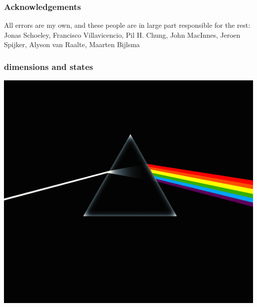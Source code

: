 \documentclass[20pt]{beamer}
\begin{document}
\begin{frame}
\frametitle{Acknowledgements}
All errors are my own, and these people are in large part responsible for the
rest:
\\
Jonas Schoeley, Francisco Villavicencio, Pil H. Chung, John MacInnes, Jeroen
Spijker, Alyson van Raalte, Maarten Bijlsma
\end{frame}

\begin{frame}
\frametitle{dimensions and states}
\vspace{-10em}
\begin{center}
\hspace*{-6cm}\includegraphics[scale=.7]{Figures/prism.jpg}
\end{center}
\end{frame}
\end{document}
